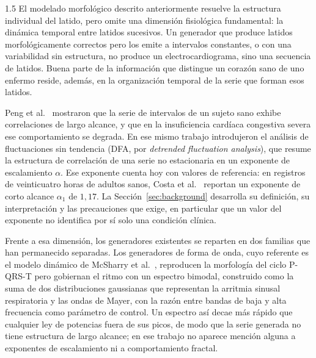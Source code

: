 \begin{spacing}{1.5}
El modelado morfológico descrito anteriormente resuelve la estructura individual del latido, pero omite una dimensión fisiológica fundamental: la dinámica temporal entre latidos sucesivos. Un generador que produce latidos morfológicamente correctos pero los emite a intervalos constantes, o con una variabilidad sin estructura, no produce un electrocardiograma, sino una secuencia de latidos. Buena parte de la información que distingue un corazón sano de uno enfermo reside, además, en la organización temporal de la serie que forman esos latidos.

Peng et al.\ \cite{peng1995quantification} mostraron que la serie de intervalos de un sujeto sano exhibe correlaciones de largo alcance, y que en la insuficiencia cardíaca congestiva severa ese comportamiento se degrada. En ese mismo trabajo introdujeron el análisis de fluctuaciones sin tendencia (DFA, por \emph{detrended fluctuation analysis}), que resume la estructura de correlación de una serie no estacionaria en un exponente de escalamiento $\alpha$. Ese exponente cuenta hoy con valores de referencia: en registros de veinticuatro horas de adultos sanos, Costa et al.\ \cite{costa2017fragmentation} reportan un exponente de corto alcance $\alpha_1$ de $1{,}17$. La Sección~\ref{sec:background} desarrolla su definición, su interpretación y las precauciones que exige, en particular que un valor del exponente no identifica por sí solo una condición clínica.

Frente a esa dimensión, los generadores existentes se reparten en dos familias que han permanecido separadas. Los generadores de forma de onda, cuyo referente es el modelo dinámico de McSharry et al.\ \cite{mcsharry2003dynamical}, reproducen la morfología del ciclo P-QRS-T pero gobiernan el ritmo con un espectro bimodal, construido como la suma de dos distribuciones gaussianas que representan la arritmia sinusal respiratoria y las ondas de Mayer, con la razón entre bandas de baja y alta frecuencia como parámetro de control. Un espectro así decae más rápido que cualquier ley de potencias fuera de sus picos, de modo que la serie generada no tiene estructura de largo alcance; en ese trabajo no aparece mención alguna a exponentes de escalamiento ni a comportamiento fractal.


\end{spacing}
